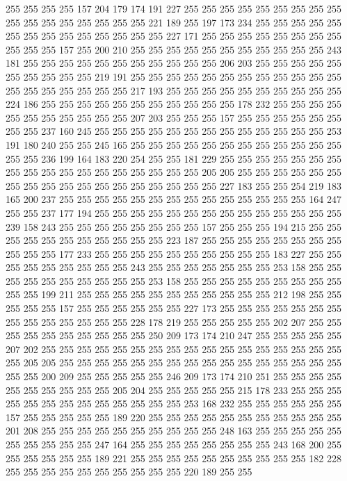 255 255 255 255 157 204 179 174 191 227 255 255 255 255 255 255 255 255 255 255
255 255 255 255 255 255 255 221 189 255 197 173 234 255 255 255 255 255 255 255
255 255 255 255 255 255 255 227 171 255 255 255 255 255 255 255 255 255 255 255
157 255 200 210 255 255 255 255 255 255 255 255 255 255 255 243 181 255 255 255
255 255 255 255 255 255 255 255 206 203 255 255 255 255 255 255 255 255 255 255
219 191 255 255 255 255 255 255 255 255 255 255 255 255 255 255 255 255 255 255
255 217 193 255 255 255 255 255 255 255 255 255 255 224 186 255 255 255 255 255
255 255 255 255 255 255 178 232 255 255 255 255 255 255 255 255 255 255 255 207
203 255 255 255 157 255 255 255 255 255 255 255 255 237 160 245 255 255 255 255
255 255 255 255 255 255 255 255 255 253 191 180 240 255 255 245 165 255 255 255
255 255 255 255 255 255 255 255 255 255 255 236 199 164 183 220 254 255 255 181
229 255 255 255 255 255 255 255 255 255 255 255 255 255 255 255 255 255 255 205
205 255 255 255 255 255 255 255 255 255 255 255 255 255 255 255 255 255 255 227
183 255 255 254 219 183 165 200 237 255 255 255 255 255 255 255 255 255 255 255
255 255 255 164 247 255 255 237 177 194 255 255 255 255 255 255 255 255 255 255
255 255 255 255 239 158 243 255 255 255 255 255 255 255 255 157 255 255 255 194
215 255 255 255 255 255 255 255 255 255 255 255 223 187 255 255 255 255 255 255
255 255 255 255 255 177 233 255 255 255 255 255 255 255 255 255 255 183 227 255
255 255 255 255 255 255 255 255 243 255 255 255 255 255 255 255 253 158 255 255
255 255 255 255 255 255 255 255 253 158 255 255 255 255 255 255 255 255 255 255
255 199 211 255 255 255 255 255 255 255 255 255 255 255 212 198 255 255 255 255
255 157 255 255 255 255 255 255 227 173 255 255 255 255 255 255 255 255 255 255
255 255 255 255 228 178 219 255 255 255 255 255 202 207 255 255 255 255 255 255
255 255 255 255 250 209 173 174 210 247 255 255 255 255 255 207 202 255 255 255
255 255 255 255 255 255 255 255 255 255 255 255 255 255 255 205 205 255 255 255
255 255 255 255 255 255 255 255 255 255 255 255 255 255 255 200 209 255 255 255
255 255 246 209 173 174 210 251 255 255 255 255 255 255 255 255 255 255 205 204
255 255 255 255 255 215 178 233 255 255 255 255 255 255 255 255 255 255 255 255
255 253 168 232 255 255 255 255 255 255 157 255 255 255 255 255 189 220 255 255
255 255 255 255 255 255 255 255 255 201 208 255 255 255 255 255 255 255 255 255
255 248 163 255 255 255 255 255 255 255 255 255 255 247 164 255 255 255 255 255
255 255 255 243 168 200 255 255 255 255 255 255 189 221 255 255 255 255 255 255
255 255 255 255 182 228 255 255 255 255 255 255 255 255 255 255 220 189 255 255
